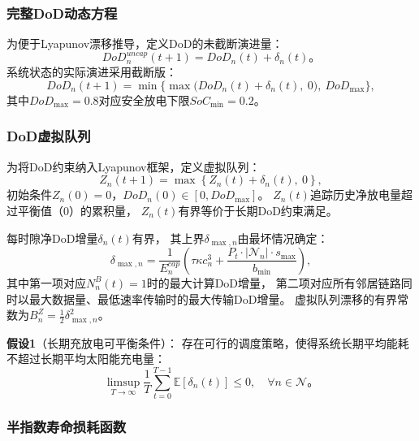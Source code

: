 \documentclass[a4paper,11pt]{article}
\begin{document}
\subsubsection{完整DoD动态方程}

为便于Lyapunov漂移推导，定义DoD的未截断演进量：
\begin{equation}
    DoD^{uncap}_n(t\!+\!1) = DoD_n(t) + \delta_n(t)。
    \label{eq:dod_uncap}
\end{equation}
系统状态的实际演进采用截断版：
\begin{equation}
    DoD_n(t\!+\!1) = \min\!\Big\{\max\!\Big(
    DoD_n(t) + \delta_n(t),~0\Big),
    ~DoD_{\max}\Big\},
    \label{eq:dod_dynamics}
\end{equation}
其中$DoD_{\max} = 0.8$对应安全放电下限$SoC_{\min} = 0.2$。

\subsubsection{DoD虚拟队列}

为将DoD约束纳入Lyapunov框架，定义虚拟队列：
\begin{equation}
    Z_n(t+1) = \max\left\{Z_n(t) + \delta_n(t),\ 0\right\},
    \label{eq:virtual_queue}
\end{equation}
初始条件$Z_n(0) = 0$，$DoD_n(0) \in [0, DoD_{\max}]$。
$Z_n(t)$追踪历史净放电量超过平衡值（0）的累积量，
$Z_n(t)$有界等价于长期DoD约束满足。

每时隙净DoD增量$\delta_n(t)$有界，
其上界$\delta_{\max,n}$由最坏情况确定：
\begin{equation}
    \delta_{\max,n} = \frac{1}{E^{cap}_n}\left(
    \tau \kappa c^3_n
    + \frac{P_t \cdot |\mathcal{N}_n| \cdot s_{\max}}{b_{\min}}
    \right),
    \label{eq:delta_max}
\end{equation}
其中第一项对应$N^B_n(t)=1$时的最大计算DoD增量，
第二项对应所有邻居链路同时以最大数据量、最低速率传输时的最大传输DoD增量。
虚拟队列漂移的有界常数为$B^Z_n = \frac{1}{2}\delta^2_{\max,n}$。

\textbf{假设1}（长期充放电可平衡条件）：
存在可行的调度策略，使得系统长期平均能耗不超过长期平均太阳能充电量：
\begin{equation}
    \limsup_{T\to\infty}\frac{1}{T}\sum_{t=0}^{T-1}
    \mathbb{E}[\delta_n(t)] \leq 0,
    \quad \forall n \in \mathcal{N}。
    \label{eq:assumption1}
\end{equation}

\subsubsection{半指数寿命损耗函数}
\end{document}
